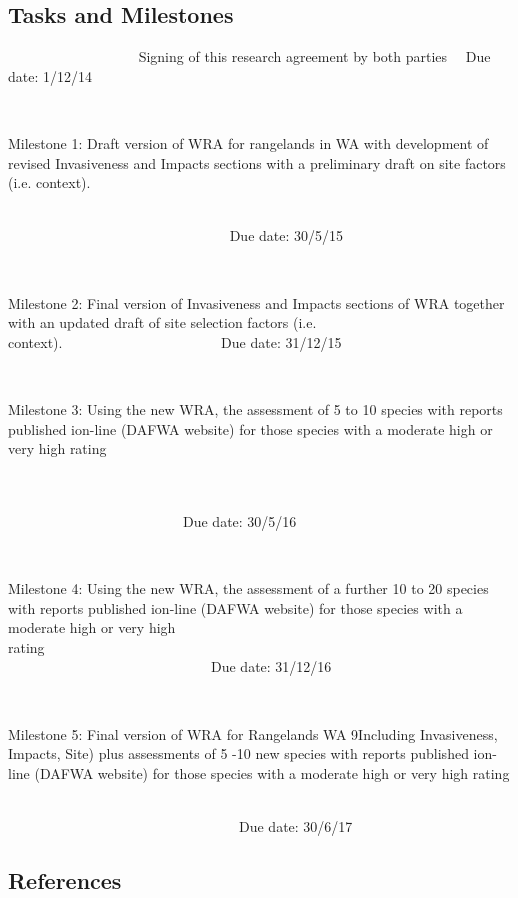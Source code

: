 \documentclass[version=last,
    paper=a4, %
    10pt, %
    usenames,
    dvipsnames,
    oneside, %
    headings=openany, %
    DIV=15 %
]{scrbook}
\begin{document}
\subsection*{Tasks and Milestones}
~~~~~~~~~~~~~~~~~~ Signing of this research agreement by both parties~~
Due date: 1/12/14

~

Milestone 1: Draft version of WRA for rangelands in WA with development
of revised Invasiveness and Impacts sections with a preliminary draft on
site factors (i.e. context).

~~~~~~~~~~~~~~~~~~~~~~~~~~~~~~~~~~~~~~~~~~~~~~~~~~~~~~~~~~~~~~~~~~~~~~~~~~~~~~~~~~~~~~~~~~~~~~~~~~~~
~~~Due date: 30/5/15

~

Milestone 2: Final version of Invasiveness and Impacts sections of WRA
together with an updated draft of site selection factors (i.e.
context).~~~~~~~~~~~~~~~~~~~~~~ Due date: 31/12/15

~

Milestone 3: Using the new WRA, the assessment of 5 to 10 species with
reports published ion-line (DAFWA website) for those species with a
moderate high or very high rating

~~~~~~
~~~~~~~~~~~~~~~~~~~~~~~~~~~~~~~~~~~~~~~~~~~~~~~~~~~~~~~~~~~~~~~~~~~~~~~~~~~~~~~~~~~~~~~~~~~~~~~~~Due
date: 30/5/16

~

Milestone 4: Using the new WRA, the assessment of a further 10 to 20
species with reports published ion-line (DAFWA website) for those
species with a moderate high or very high
rating~~~~~~~~~~~~~~~~~~~~~~~~~~~~~~~~~~~~~~~~~~~~~~~~~~~~~~~~~~~~~~~~~~
~~~~~~~~~~~~~~~~~~~~~~~~~~~~~Due date: 31/12/16

~

Milestone 5: Final version of WRA for Rangelands WA 9Including
Invasiveness, Impacts, Site) plus assessments of 5 -10 new species with
reports published ion-line (DAFWA website) for those species with a
moderate high or very high rating

~~~~~~~~~~~~~~~~~~~~~~~~~~~~~~~~~~~~~~~~~~~~~~~~~~~~~~~~~~~~~~~~~~~~~~~~~~~~~~~~~~~~~~~~~~~~~~~~~~~~~~~~~Due
date: 30/6/17



\subsection*{References}
\end{document}
